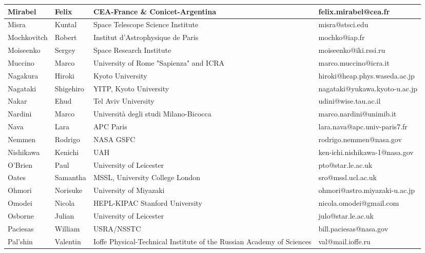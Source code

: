 \begin{center}
\begin{longtable}{|p{1.28cm} |p{1.28cm} |p{2.9cm} |p{3cm} |}
\tiny Mirabel &\tiny Felix & \tiny CEA-France \& Conicet-Argentina & \tiny felix.mirabel@cea.fr \\ \hline
\tiny Misra &\tiny Kuntal & \tiny Space Telescope Science Institute & \tiny misra@stsci.edu \\ \hline
\tiny Mochkovitch &\tiny Robert & \tiny Institut d'Astrophysique de Paris & \tiny mochko@iap.fr \\ \hline
\tiny Moiseenko &\tiny Sergey & \tiny Space Research Institute & \tiny moiseenko@iki.rssi.ru \\ \hline
\tiny Muccino &\tiny Marco & \tiny University of Rome "Sapienza" and ICRA & \tiny marco.muccino@icra.it \\ \hline
\tiny Nagakura &\tiny Hiroki & \tiny Kyoto University & \tiny hiroki@heap.phys.waseda.ac.jp \\ \hline
\tiny Nagataki &\tiny Shigehiro & \tiny YITP, Kyoto University & \tiny nagataki@yukawa.kyoto-u.ac.jp \\ \hline
\tiny Nakar &\tiny Ehud & \tiny Tel Aviv University & \tiny udini@wise.tau.ac.il \\ \hline
\tiny Nardini &\tiny Marco & \tiny Universit\`a degli studi Milano-Bicocca & \tiny marco.nardini@unimib.it \\ \hline
\tiny Nava &\tiny Lara & \tiny APC Paris & \tiny lara.nava@apc.univ-paris7.fr \\ \hline
\tiny Nemmen &\tiny Rodrigo & \tiny NASA GSFC & \tiny rodrigo.nemmen@nasa.gov \\ \hline
\tiny Nishikawa &\tiny Kenichi & \tiny UAH & \tiny ken-ichi.nishikawa-1@nasa.gov \\ \hline
\tiny O'Brien &\tiny Paul & \tiny University of Leicester & \tiny pto@star.le.ac.uk \\ \hline
\tiny Oates &\tiny Samantha & \tiny MSSL, University College London  & \tiny sro@mssl.ucl.ac.uk \\ \hline
\tiny Ohmori &\tiny Norisuke & \tiny University of Miyazaki & \tiny ohmori@astro.miyazaki-u.ac.jp \\ \hline
\tiny Omodei &\tiny Nicola & \tiny HEPL-KIPAC Stanford University & \tiny nicola.omodei@gmail.com \\ \hline
\tiny Osborne &\tiny Julian & \tiny University of Leicester & \tiny julo@star.le.ac.uk \\ \hline
\tiny Paciesas &\tiny William & \tiny USRA/NSSTC & \tiny bill.paciesas@nasa.gov \\ \hline
\tiny Pal'shin &\tiny Valentin & \tiny Ioffe Physical-Technical Institute of the Russian Academy of Sciences & \tiny val@mail.ioffe.ru \\ \hline

\end{longtable}
\end{center}
